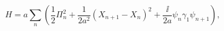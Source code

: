 \begin{equation}\label{toy-discr-h}
  H=a\sum_n\left(\frac{1}{2}\Pi^2_n+\frac{1}{2a^2}(X_{n+1}-X_n)^2+
  \frac{\ii}{2a}\psi_n\gamma_1\psi_{n+1}\right),
\end{equation}

